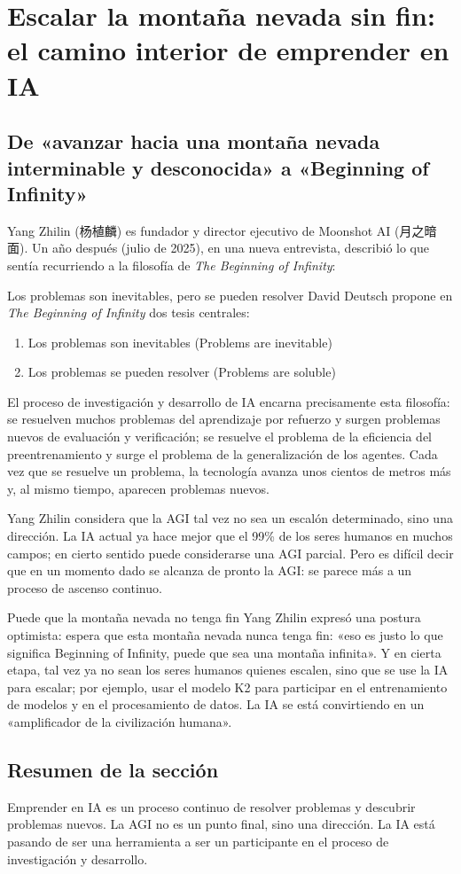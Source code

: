 \section{Escalar la montaña nevada sin fin: el camino interior de emprender en IA}

\subsection{De «avanzar hacia una montaña nevada interminable y desconocida» a «Beginning of Infinity»}

Yang Zhilin (杨植麟) es fundador y director ejecutivo de Moonshot AI (月之暗面). Un año después (julio de 2025), en una nueva entrevista, describió lo que sentía recurriendo a la filosofía de \textit{The Beginning of Infinity}:

\begin{importantbox}{Los problemas son inevitables, pero se pueden resolver}
David Deutsch propone en \textit{The Beginning of Infinity} dos tesis centrales:
\begin{enumerate}
    \item Los problemas son inevitables (Problems are inevitable)
    \item Los problemas se pueden resolver (Problems are soluble)
\end{enumerate}
El proceso de investigación y desarrollo de IA encarna precisamente esta filosofía: se resuelven muchos problemas del aprendizaje por refuerzo y surgen problemas nuevos de evaluación y verificación; se resuelve el problema de la eficiencia del preentrenamiento y surge el problema de la generalización de los agentes. Cada vez que se resuelve un problema, la tecnología avanza unos cientos de metros más y, al mismo tiempo, aparecen problemas nuevos.
\end{importantbox}

Yang Zhilin considera que la AGI tal vez no sea un escalón determinado, sino una dirección. La IA actual ya hace mejor que el 99\% de los seres humanos en muchos campos; en cierto sentido puede considerarse una AGI parcial. Pero es difícil decir que en un momento dado se alcanza de pronto la AGI: se parece más a un proceso de ascenso continuo.

\begin{knowledgebox}{Puede que la montaña nevada no tenga fin}
Yang Zhilin expresó una postura optimista: espera que esta montaña nevada nunca tenga fin: «eso es justo lo que significa Beginning of Infinity, puede que sea una montaña infinita». Y en cierta etapa, tal vez ya no sean los seres humanos quienes escalen, sino que se use la IA para escalar; por ejemplo, usar el modelo K2 para participar en el entrenamiento de modelos y en el procesamiento de datos. La IA se está convirtiendo en un «amplificador de la civilización humana».
\end{knowledgebox}

\subsection{Resumen de la sección}

Emprender en IA es un proceso continuo de resolver problemas y descubrir problemas nuevos. La AGI no es un punto final, sino una dirección. La IA está pasando de ser una herramienta a ser un participante en el proceso de investigación y desarrollo.

